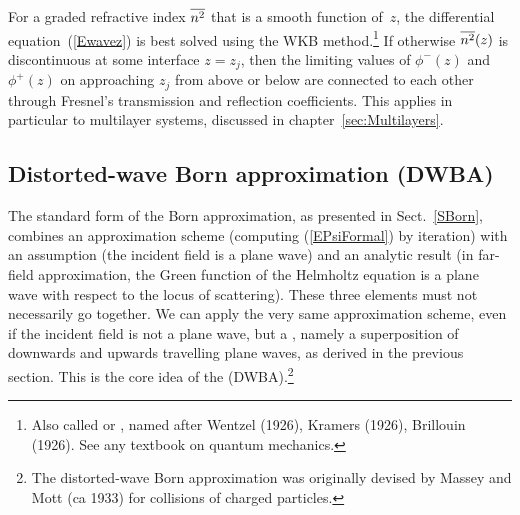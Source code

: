 For a graded refractive index
%
$\overline{n^2}$ that is a smooth function of~$z$,
the differential equation~(\ref{Ewavez}) is best solved
using the WKB method.\footnote
{Also called  or
,
named after Wentzel (1926), Kramers (1926), Brillouin (1926).
See any textbook on quantum mechanics.}
%
%
%
If otherwise $\overline{n^2}(z)$ is discontinuous at some interface $z=z_j$,
then the limiting values of $\phi^-(z)$ and $\phi^+(z)$
on approaching $z_j$ from above or below
are connected to each other through Fresnel's
transmission and reflection coefficients.
%
This applies in particular to multilayer systems,
discussed in chapter~\ref{sec:Multilayers}.

\subsection{Distorted-wave Born approximation (DWBA)}\label{SDWBA}

%
%

The standard form of the Born approximation,
as presented in Sect.~\ref{SBorn},
combines an approximation scheme
(computing (\ref{EPsiFormal}) by iteration)
with an assumption (the incident field is a plane wave)
and an analytic result
(in far-field approximation,
the Green function of the Helmholtz equation is a plane wave
with respect to the locus of scattering).
These three elements must not necessarily go together.
We can apply the very same approximation scheme,
even if the incident field is not a plane wave,
but a ,
namely a superposition of downwards and upwards travelling plane waves,
as derived in the previous section.
This is the core idea
of the  (DWBA).\footnote
{The distorted-wave Born approximation
was originally devised by Massey and Mott (ca 1933)
for collisions of charged particles.}


